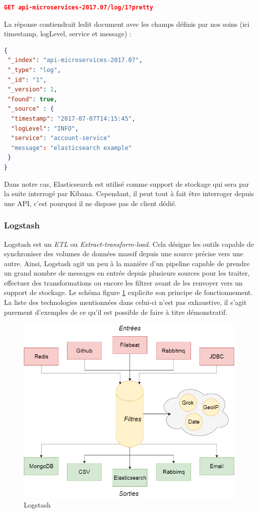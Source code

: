 \begin{lstlisting}[language=json]
 GET api-microservices-2017.07/log/1?pretty
 \end{lstlisting}
	
	La réponse contiendrait ledit document avec les champs définis par nos soins (ici timestamp, logLevel, service et message) :
	
\begin{lstlisting}[language=json]
{
 "_index": "api-microservices-2017.07",
 "_type": "log",
 "_id": "1",
 "_version": 1,
 "found": true,
 "_source" : {
  "timestamp": "2017-07-07T14:15:45",
  "logLevel": "INFO",
  "service": "account-service"
  "message": "elasticsearch example"
 }
}
	\end{lstlisting}
	 
	 Dans notre cas, Elasticsearch \cite{bib_elastic} est utilisé comme support de stockage qui sera par la suite interrogé par Kibana. Cependant, il peut tout à fait être interroger depuis une API, c'est pourquoi il ne dispose pas de client dédié.
	
	\subsubsection{Logstash}
	Logstash \cite{bib_logstash} est un \textit{ETL} ou \textit{Extract-transform-load}. Cela désigne les outils capable de synchroniser des volumes de données massif depuis une source précise vers une autre. Ainsi, Logstash agit un peu à la manière d'un pipeline capable de prendre un grand nombre de messages en entrée depuis plusieurs sources pour les traiter, effectuer des transformations ou encore les filtrer avant de les renvoyer vers un support de stockage. Le schéma figure \ref{logstash} explicite son principe de fonctionnement. La liste des technologies mentionnées dans celui-ci n'est pas exhaustive, il s'agit purement d'exemples de ce qu'il est possible de faire à titre démonstratif. \\
	
	\begin{figure}[h!]
		\includegraphics[scale=0.4]{images/travailNeuflizeOBC/dashboard/logstash.png}
		\centering
		\caption{Logstash}
		\label{logstash}
	\end{figure}
	
